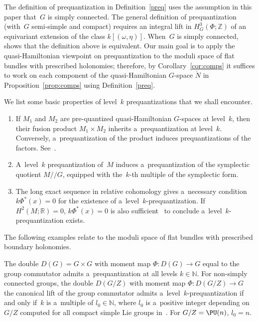 \begin{Remark}
The def\/inition of prequantization in Def\/inition~\ref{preq} uses the assumption in this paper that~$G$ is simply
connected.
The general def\/inition of prequantization~\cite[Def\/inition~3.2]{Khomology} (with~$G$ semi-simple and compact) requires
an integral lift in $H^3_G(\Phi;{\mathbb{Z}})$ of an equivariant extension of the class $k[(\omega,\eta)]$.
When~$G$ is simply connected,~\cite[Proposition~3.5]{JGP} shows that the def\/inition above is equivalent.
Our main goal is to apply the quasi-Hamiltonian viewpoint on prequantization to the moduli space of f\/lat bundles with
prescribed holonomies; therefore, by Corollary~\ref{cor:comps} it suf\/f\/ices to work on each component of the
quasi-Hamiltonian $G$-space $\check{N}$ in Proposition~\ref{prop:comps} using Def\/inition~\ref{preq}.
\end{Remark}

We list some basic properties of level~$k$ prequantizations that we shall encounter.
\begin{enumerate}\itemsep=0pt
\item[(a)] If $M_1$ and $M_2$ are pre-quantized quasi-Hamiltonian $G$-spaces at level~$k$, then their fusion product
$M_1 \times M_2$ inherits a~prequantization at level~$k$.
Conversely, a~prequantization of the product induces prequantizations of the factors.
See~\cite[Proposition~3.8]{JGP}.
\item[(b)] A~level~$k$ prequantization of~$M$ induces a~prequantization of the symplectic quotient $M/  / G$, equipped
with the~$k$-th multiple of the symplectic form.
\item[(c)] The long exact sequence in relative cohomology gives a~necessary condition $k\Phi^*(x)=0$ for the existence
of a~level~$k$-prequantization.
If $H^2(M;{\mathbb{R}})=0$, $k\Phi^*(x)=0$ is also suf\/f\/icient~\cite[Proposition~4.2]{JGP} to conclude
a~level~$k$-prequantization exists.
\end{enumerate}

The following examples relate to the moduli space of f\/lat bundles with prescribed boundary holonomies.

\begin{Example}
\label{eg:double}
The double $D(G)=G\times G$ with moment map $\Phi: D(G) \to G$ equal to the group commutator admits a~prequantization at
all levels $k\in {\mathbb{N}}$.
For non-simply connected groups, the double $D(G/Z)$ with moment map $\Phi: D(G/Z) \to G$ the canonical lift of the
group commutator admits a~level~$k$-prequantization if and only if~$k$ is a~multiple of $l_0 \in {\mathbb{N}}$, where
$l_0$ is a~positive integer depending on $G/Z$ computed for all compact simple Lie groups in~\cite{JGP}.
For $G/Z = \PU(n)$, $l_0=n$.
\end{Example}

